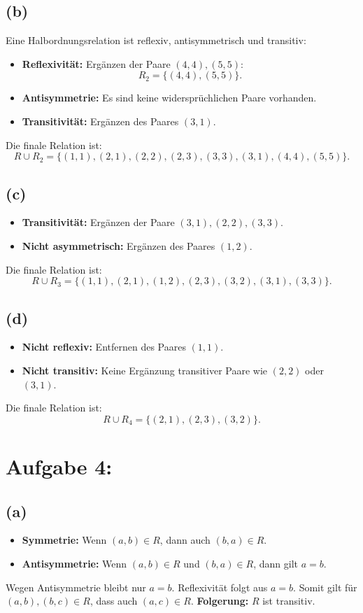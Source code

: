 \documentclass[a4paper]{scrartcl}
\begin{document}
\subsection*{(b)}
Eine Halbordnungsrelation ist reflexiv, antisymmetrisch und transitiv:
\begin{itemize}
    \item \textbf{Reflexivität:} Ergänzen der Paare \((4, 4), (5, 5)\):
    \[
    R_2 = \{(4, 4), (5, 5)\}.
    \]
    \item \textbf{Antisymmetrie:} Es sind keine widersprüchlichen Paare vorhanden.
    \item \textbf{Transitivität:} Ergänzen des Paares \((3, 1)\).
\end{itemize}
Die finale Relation ist:
\[
R \cup R_2 = \{(1, 1), (2, 1), (2, 2), (2, 3), (3, 3), (3, 1), (4, 4), (5, 5)\}.
\]

\subsection*{(c)}
\begin{itemize}
    \item \textbf{Transitivität:} Ergänzen der Paare \((3, 1), (2, 2), (3, 3)\).
    \item \textbf{Nicht asymmetrisch:} Ergänzen des Paares \((1, 2)\).
\end{itemize}
Die finale Relation ist:
\[
R \cup R_3 = \{(1, 1), (2, 1), (1, 2), (2, 3), (3, 2), (3, 1), (3, 3)\}.
\]

\subsection*{(d)}
\begin{itemize}
    \item \textbf{Nicht reflexiv:} Entfernen des Paares \((1, 1)\).
    \item \textbf{Nicht transitiv:} Keine Ergänzung transitiver Paare wie \((2, 2)\) oder \((3, 1)\).
\end{itemize}
Die finale Relation ist:
\[
R \cup R_4 = \{(2, 1), (2, 3), (3, 2)\}.
\]

\section*{Aufgabe 4:}

\subsection*{(a)}
\begin{itemize}
    \item \textbf{Symmetrie:} Wenn \((a, b) \in R\), dann auch \((b, a) \in R\).
    \item \textbf{Antisymmetrie:} Wenn \((a, b) \in R\) und \((b, a) \in R\), dann gilt \( a = b \).
\end{itemize}
Wegen Antisymmetrie bleibt nur \( a = b \). Reflexivität folgt aus \( a = b \). Somit gilt für \((a, b), (b, c) \in R\), dass auch \((a, c) \in R\).  
\textbf{Folgerung:} \( R \) ist transitiv.
\end{document}
